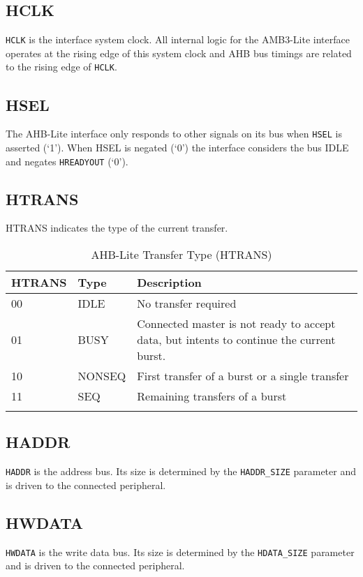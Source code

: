 \subsection{HCLK}\label{hclk}

\texttt{HCLK} is the interface system clock. All internal logic for the AMB3-Lite
interface operates at the rising edge of this system clock and AHB bus
timings are related to the rising edge of \texttt{HCLK}.

\subsection{HSEL}\label{hsel}

The AHB-Lite interface only responds to other signals on its bus when
\texttt{HSEL} is asserted (`1'). When HSEL is negated (`0') the interface
considers the bus IDLE and negates \texttt{HREADYOUT} (`0').


\subsection{HTRANS}\label{htrans}

HTRANS indicates the type of the current transfer.

\begin{longtable}[]{@{}llp{11cm}@{}}
	\toprule
		HTRANS & Type   & Description\tabularnewline
	\midrule
	\endhead
		00     & IDLE   & No transfer required\tabularnewline
		01     & BUSY   & Connected master is not ready to accept data, but intents to continue the current burst.\tabularnewline
		10     & NONSEQ & First transfer of a burst or a single transfer\tabularnewline
		11     & SEQ    & Remaining transfers of a burst\tabularnewline
	\bottomrule
	\caption{AHB-Lite Transfer Type (HTRANS)}
\end{longtable}

\subsection{HADDR}\label{haddr}

\texttt{HADDR} is the address bus. Its size is determined by the \texttt{HADDR\_SIZE}
parameter and is driven to the connected peripheral.

\subsection{HWDATA}\label{hwdata}

\texttt{HWDATA} is the write data bus. Its size is determined by the \texttt{HDATA\_SIZE}
parameter and is driven to the connected peripheral.

